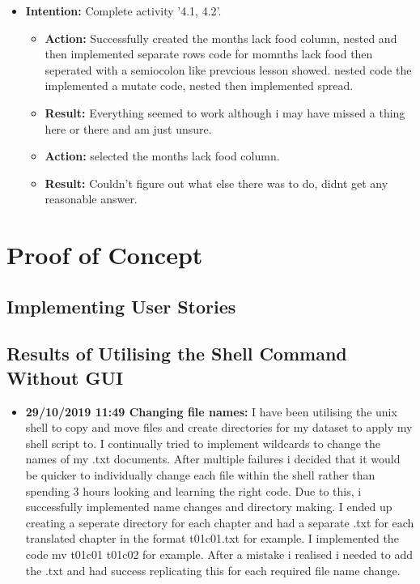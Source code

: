 \documentclass{article}
\begin{document}
\begin{itemize}
\begin{itemize}
\end{itemize}

\item{\textbf{Intention:} Complete activity '4.1, 4.2'.}

\begin{itemize}
\item{\textbf{Action:} Successfully created the months lack food column, nested and then implemented separate rows code for momnths lack food then seperated with a semiocolon like prevcious lesson showed. nested code the implemented a mutate code, nested then implemented spread.}
\item{\textbf{Result:} Everything seemed to work although i may have missed a thing here or there and am just unsure.}

\item{\textbf{Action:} selected the months lack food column.}
\item{\textbf{Result:} Couldn't figure out what else there was to do, didnt get any reasonable answer.}


\end{itemize}




 
\end{itemize}

\section{Proof of Concept}

\subsection{Implementing User Stories}


\subsection{Results of Utilising the Shell Command Without GUI}

\begin{itemize}
    \item{\textbf{ 29/10/2019 11:49 Changing file names:} I have been utilising the unix shell to copy and move files and create directories for my dataset to apply my shell script to. I continually tried to implement wildcards to change the names of my .txt documents. After multiple failures i decided that it would be quicker to individually change each file within the shell rather than spending 3 hours looking and learning the right code. Due to this, i successfully implemented name changes and directory making. I ended up creating a seperate directory for each chapter and had a separate .txt for each translated chapter in the format t01c01.txt for example. I implemented the code mv t01c01 t01c02 for example. After a mistake i realised i needed to add the .txt and had success replicating this for each required file name change.} 
\end{itemize}
\end{document}
